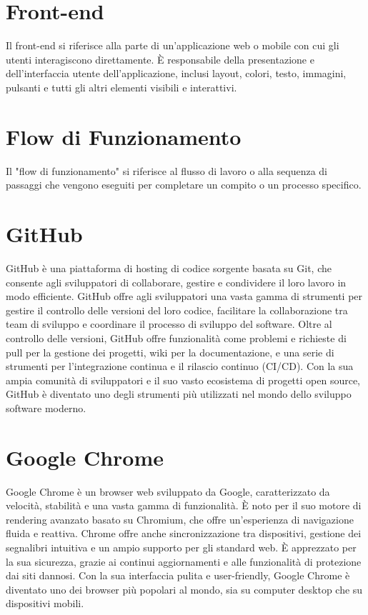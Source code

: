 \documentclass{article}
\begin{document}
\section{Front-end}
Il front-end si riferisce alla parte di un'applicazione web o mobile con cui gli utenti interagiscono direttamente. È responsabile della presentazione e dell'interfaccia utente dell'applicazione, inclusi layout, colori, testo, immagini, pulsanti e tutti gli altri elementi visibili e interattivi.

\section{Flow di Funzionamento}
 Il "flow di funzionamento" si riferisce al flusso di lavoro o alla sequenza di passaggi che vengono eseguiti per completare un compito o un processo specifico.

\section{GitHub}
GitHub è una piattaforma di hosting di codice sorgente basata su Git, che consente agli sviluppatori di collaborare, gestire e condividere il loro lavoro in modo efficiente. GitHub offre agli sviluppatori una vasta gamma di strumenti per gestire il controllo delle versioni del loro codice, facilitare la collaborazione tra team di sviluppo e coordinare il processo di sviluppo del software. Oltre al controllo delle versioni, GitHub offre funzionalità come problemi e richieste di pull per la gestione dei progetti, wiki per la documentazione, e una serie di strumenti per l'integrazione continua e il rilascio continuo (CI/CD). Con la sua ampia comunità di sviluppatori e il suo vasto ecosistema di progetti open source, GitHub è diventato uno degli strumenti più utilizzati nel mondo dello sviluppo software moderno.

\section{Google Chrome}
Google Chrome è un browser web sviluppato da Google, caratterizzato da velocità, stabilità e una vasta gamma di funzionalità. È noto per il suo motore di rendering avanzato basato su Chromium, che offre un'esperienza di navigazione fluida e reattiva. Chrome offre anche sincronizzazione tra dispositivi, gestione dei segnalibri intuitiva e un ampio supporto per gli standard web. È apprezzato per la sua sicurezza, grazie ai continui aggiornamenti e alle funzionalità di protezione dai siti dannosi. Con la sua interfaccia pulita e user-friendly, Google Chrome è diventato uno dei browser più popolari al mondo, sia su computer desktop che su dispositivi mobili.
\end{document}
